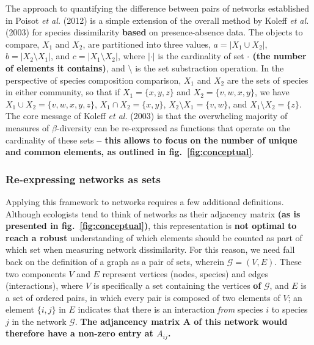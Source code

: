 \documentclass[11pt]{article}
\makeatletter
\def\maxwidth{\ifdim\Gin@nat@width>\linewidth\linewidth
\else\Gin@nat@width\fi}
\let\Oldincludegraphics\includegraphics
\renewcommand{\includegraphics}[1]{\Oldincludegraphics[width=\maxwidth]{#1}}
\providecommand{\DIFaddtex}[1]{{\bf #1}} %
\providecommand{\DIFdeltex}[1]{} %
\providecommand{\DIFaddbegin}{\protect\color{blue}} %
\providecommand{\DIFaddend}{\protect\color{black}} %
\providecommand{\DIFdelbegin}{\protect\color{red}} %
\providecommand{\DIFdelend}{\protect\color{black}} %
\providecommand{\DIFadd}[1]{\texorpdfstring{\DIFaddtex{#1}}{#1}} %
\providecommand{\DIFdel}[1]{\texorpdfstring{\DIFdeltex{#1}}{}} %
\newcommand{\DIFscaledelfig}{0.5}
\newlength{\DIFdelgraphicswidth} %
\newlength{\DIFdelgraphicsheight} %
\newcommand{\DIFaddincludegraphics}[2][]{{\color{blue}\fbox{\DIFOincludegraphics[#1]{#2}}}} %
\newcommand{\DIFdelincludegraphics}[2][]{%
\sbox{\DIFdelgraphicsbox}{\DIFOincludegraphics[#1]{#2}}%
\settoboxwidth{\DIFdelgraphicswidth}{\DIFdelgraphicsbox} %
\settoboxtotalheight{\DIFdelgraphicsheight}{\DIFdelgraphicsbox} %
\scalebox{\DIFscaledelfig}{%
\parbox[b]{\DIFdelgraphicswidth}{\usebox{\DIFdelgraphicsbox}\\[-\baselineskip] \rule{\DIFdelgraphicswidth}{0em}}\llap{\resizebox{\DIFdelgraphicswidth}{\DIFdelgraphicsheight}{%
\setlength{\unitlength}{\DIFdelgraphicswidth}%
\begin{picture}(1,1)%
\thicklines\linethickness{2pt} %
{\color[rgb]{1,0,0}\put(0,0){\framebox(1,1){}}}%
{\color[rgb]{1,0,0}\put(0,0){\line( 1,1){1}}}%
{\color[rgb]{1,0,0}\put(0,1){\line(1,-1){1}}}%
\end{picture}%
}\hspace*{3pt}}} %
} %
\DeclareRobustCommand{\DIFaddbegin}{\DIFOaddbegin \let\includegraphics\DIFaddincludegraphics} %
\DeclareRobustCommand{\DIFaddend}{\DIFOaddend \let\includegraphics\DIFOincludegraphics} %
\DeclareRobustCommand{\DIFdelbegin}{\DIFOdelbegin \let\includegraphics\DIFdelincludegraphics} %
\DeclareRobustCommand{\DIFdelend}{\DIFOaddend \let\includegraphics\DIFOincludegraphics} %
\makeatother
\begin{document}
The approach to quantifying the difference between pairs of networks
established in Poisot \emph{et al.} (2012) is a simple extension of the
overall method by Koleff \emph{et al.} (2003) for species dissimilarity
\DIFdelbegin \DIFdel{baed }\DIFdelend \DIFaddbegin \DIFadd{based }\DIFaddend on presence-absence data. The objects to compare, \(X_1\) and
\(X_2\), are partitioned into three values, \(a = |X_1 \cup X_2|\),
\(b = |X_2 \setminus X_1|\), and \(c = |X_1 \setminus X_2|\), where
\DIFdelbegin \DIFdel{\(|x|\) }\DIFdelend \DIFaddbegin \DIFadd{\(|\cdot|\) }\DIFaddend is the cardinality of set \DIFdelbegin \DIFdel{\(x\)}\DIFdelend \DIFaddbegin \DIFadd{\(\cdot\) (the number of elements
it contains)}\DIFaddend , and \(\setminus\) is the set substraction operation. In
the perspective of species composition comparison, \(X_1\) and \(X_2\)
are the sets of species in either community, so that if
\(X_1 = \{x, y, z\}\) and \(X_2 = \{v, w, x, y\}\), we have
\(X_1 \cup X_2 = \{v, w, x, y, z\}\), \(X_1 \cap X_2 = \{x, y\}\),
\(X_2 \setminus X_1 = \{v, w\}\), and \(X_1 \setminus X_2 = \{z\}\). The
core message of Koleff \emph{et al.} (2003) is that the overwheling
majority of measures of \(\beta\)-diversity can be re-expressed as
functions that operate on the cardinality \DIFdelbegin \DIFdel{(number of elements) }\DIFdelend of these sets \DIFaddbegin \DIFadd{-- this allows
to focus on the number of unique and common elements, as outlined in
fig.~\ref{fig:conceptual}}\DIFaddend .

\hypertarget{re-expressing-networks-as-sets}{%
\subsubsection{Re-expressing networks as
sets}\label{re-expressing-networks-as-sets}}

Applying this framework to networks requires a few additional
definitions. Although ecologists tend to think of networks as their
adjacency matrix \DIFaddbegin \DIFadd{(as is presented in fig.~\ref{fig:conceptual})}\DIFaddend , this
representation is \DIFdelbegin \DIFdel{far from optimal to get a solid
}\DIFdelend \DIFaddbegin \DIFadd{not optimal to reach a robust }\DIFaddend understanding of which
elements should be counted as part of which set when measuring network
dissimilarity. For this reason, we need fall back on the definition of a
graph as a pair of sets, wherein \(\mathcal{G} = (V, E)\). These two
components \(V\) and \(E\) represent vertices (nodes, species) and edges
(interactions), where \(V\) is specifically a set containing the
vertices \DIFaddbegin \DIFadd{of }\DIFaddend \(\mathcal{G}\), and \(E\) is a set of ordered pairs, in
which every pair is composed of two elements of \(V\); an element
\(\{i,j\}\) in \(E\) indicates that there is an interaction \emph{from}
species \(i\) to species \(j\) in the network \(\mathcal{G}\). \DIFaddbegin \DIFadd{The
adjancency matrix \(\mathbf{A}\) of this network would therefore have a
non-zero entry at \(A_{ij}\).
}\DIFaddend 
\end{document}
